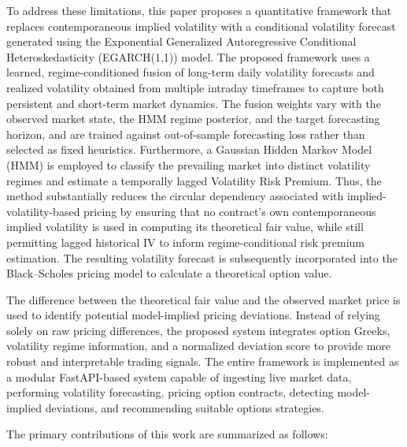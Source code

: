 \documentclass[journal]{IEEEtran}
\begin{document}
To address these limitations, this paper proposes a quantitative
framework that replaces contemporaneous implied volatility with a
conditional volatility forecast generated using the Exponential
Generalized Autoregressive Conditional Heteroskedasticity
(EGARCH(1,1)) model. The proposed framework uses a learned,
regime-conditioned fusion of long-term daily volatility forecasts and
realized volatility obtained from multiple intraday timeframes to
capture both persistent and short-term market dynamics. The fusion
weights vary with the observed market state, the HMM regime posterior,
and the target forecasting horizon, and are trained against
out-of-sample forecasting loss rather than selected as fixed
heuristics. Furthermore, a Gaussian Hidden Markov Model (HMM) is
employed to classify the prevailing market into distinct volatility
regimes and estimate a temporally lagged Volatility Risk Premium.
Thus, the method substantially reduces the circular dependency
associated with implied-volatility-based pricing by ensuring that no
contract's own contemporaneous implied volatility is used in computing
its theoretical fair value, while still permitting lagged historical IV
to inform regime-conditional risk premium estimation. The resulting
volatility forecast is subsequently incorporated into the
Black--Scholes pricing model to calculate a theoretical option value.

The difference between the theoretical fair value and the observed
market price is used to identify potential model-implied pricing
deviations. Instead of relying solely on raw pricing differences, the
proposed system integrates option Greeks, volatility regime
information, and a normalized deviation score to provide more robust
and interpretable trading signals. The entire framework is implemented
as a modular FastAPI-based system capable of ingesting live market
data, performing volatility forecasting, pricing option contracts,
detecting model-implied deviations, and recommending suitable options
strategies.

The primary contributions of this work are summarized as follows:
\end{document}
